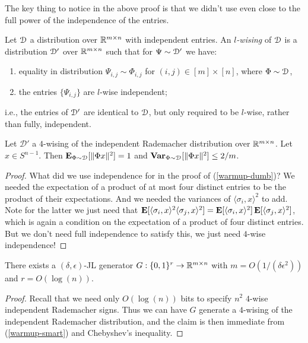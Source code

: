 The key thing to notice in the above proof is that we didn't use even
close to the full power of the independence of the entries.

\begin{definition}
  Let $\mathcal{D}$ a distribution over $\mathbb{R}^{m \times n}$ with independent
  entries. An \emph{$l$-wising} of $\mathcal{D}$ is a distribution $\mathcal{D}'$ over
  $\mathbb{R}^{m \times n}$ such that for $\Psi \sim \mathcal{D}'$ we have:
  \begin{enumerate}
  \item equality in distribution $\Psi_{i,j} \sim \Phi_{i,j}$ for
    $(i,j) \in [m] \times [n]$, where $\Phi \sim \mathcal{D}$,
  \item the entries $\{\Psi_{i,j}\}$ are $l$-wise independent;
  \end{enumerate}
  i.e., the entries of $\mathcal{D}'$ are identical to $\mathcal{D}$, but only required
  to be $l$-wise, rather than fully, independent.
\end{definition}

\begin{proposition}
  \label{warmup-smart}
  Let $\mathcal{D'}$ a $4$-wising of the independent Rademacher
  distribution over $\mathbb{R}^{m \times n}$. Let $x \in S^{n-1}$. Then
  $\operatorname*{\mathbf{E}}_{\Phi \sim \mathcal{D}}[\|\Phi x\|^2] = 1$ and $\operatorname*{\mathbf{Var}}_{\Phi \sim
    \mathcal{D}}[\|\Phi x\|^2] \le 2/m$.
\end{proposition}

\begin{proof}
  What did we use independence for in the proof of
  (\ref{warmup-dumb})? We needed the expectation of a product of at
  most four distinct entries to be the product of their
  expectations. And we needed the variances of $\langle \sigma_i, x
  \rangle^2$ to add. Note for the latter we just need that $\operatorname*{\mathbf{E}}[\langle
    \sigma_i, x \rangle^2\langle \sigma_j, x \rangle^2] = \operatorname*{\mathbf{E}}[\langle
    \sigma_i, x \rangle^2]\operatorname*{\mathbf{E}}[\langle \sigma_j, x \rangle^2]$, which is
  again a condition on the expectation of a product of four distinct
  entries. But we don't need full independence to satisfy this, we just
  need $4$-wise independence!
\end{proof}

\begin{proposition}
  \label{warmup-result}
  There exists a $(\delta,\epsilon)$-JL generator $G : \{0,1\}^r \to
  \mathbb{R}^{m \times n}$ with $m = O(1/(\delta\epsilon^2))$ and $r =
  O(\log(n))$.
\end{proposition}

\begin{proof}
  Recall that we need only $O(\log(n))$ bits to specify $n^2$ $4$-wise
  independent Rademacher signs. Thus we can have $G$ generate a
  $4$-wising of the independent Rademacher distribution, and the claim
  is then immediate from (\ref{warmup-smart}) and Chebyshev's
  inequality.
\end{proof}

